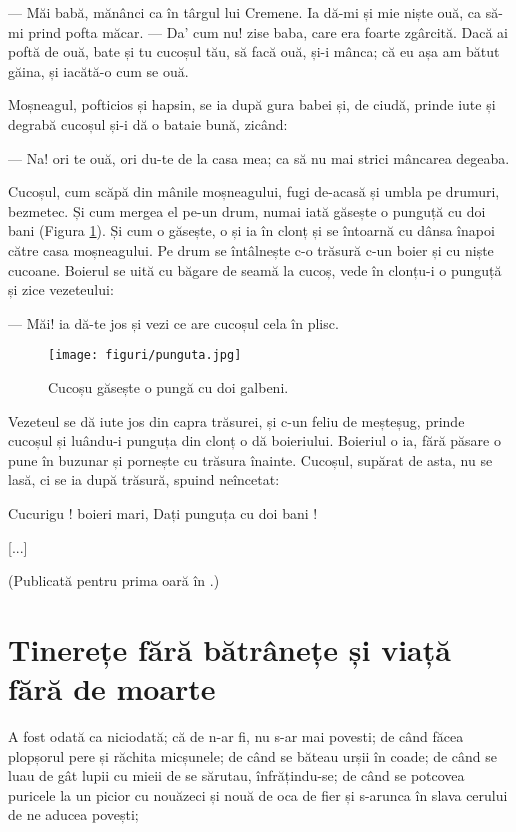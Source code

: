 \documentclass[12pt, a4paper, oneside, romanian]{teza-upb}
\begin{document}
— Măi babă, mănânci ca în târgul lui Cremene. Ia dă-mi și mie niște
ouă, ca să-mi prind pofta măcar. — Da' cum nu! zise baba, care era
foarte zgârcită. Dacă ai poftă de ouă, bate și tu cucoșul tău, să facă
ouă, și-i mânca; că eu așa am bătut găina, și iacătă-o cum se ouă.

Moșneagul, pofticios și hapsin, se ia după gura babei și, de ciudă,
prinde iute și degrabă cucoșul și-i dă o bataie bună, zicând:

— Na! ori te ouă, ori du-te de la casa mea; ca să nu mai strici
mâncarea degeaba.

Cucoșul, cum scăpă din mânile moșneagului, fugi de-acasă și umbla pe
drumuri, bezmetec. Și cum mergea el pe-un drum, numai iată găsește o
punguță cu doi bani (Figura \ref{fig:punguta}). Și cum o găsește, o și ia în clonț și se întoarnă
cu dânsa înapoi către casa moșneagului. Pe drum se întâlnește c-o
trăsură c-un boier și cu niște cucoane. Boierul se uită cu băgare de
seamă la cucoș, vede în clonțu-i o punguță și zice vezeteului:

— Măi! ia dă-te jos și vezi ce are cucoșul cela în plisc.

\begin{figure}[tb]
\centering
\texttt{[image: figuri/punguta.jpg]}
\caption{Cucoșu găsește o pungă cu doi galbeni.}
\label{fig:punguta}
\end{figure}



Vezeteul se dă iute jos din capra trăsurei, și c-un feliu de meșteșug,
prinde cucoșul și luându-i punguța din clonț o dă boieriului. Boieriul
o ia, fără păsare o pune în buzunar și pornește cu trăsura
înainte. Cucoșul, supărat de asta, nu se lasă, ci se ia după trăsură,
spuind neîncetat:

Cucurigu ! boieri mari, Dați punguța cu doi bani !


[...]

(Publicată pentru prima oară în \cite{punguta1876}.)

\section{Tinerețe fără bătrânețe și viață fără de moarte}

A fost odată ca niciodată; că de n-ar fi, nu s-ar mai povesti; de când
făcea plopșorul pere și răchita micșunele; de când se băteau urșii în
coade; de când se luau de gât lupii cu mieii de se sărutau,
înfrățindu-se; de când se potcovea puricele la un picior cu nouăzeci
și nouă de oca de fier și s-arunca în slava cerului de ne aducea
povești;
\end{document}
